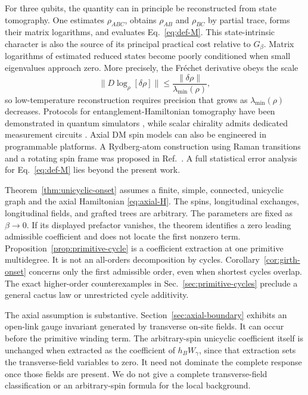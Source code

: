 \documentclass[aps,prb,preprint,nofootinbib,longbibliography]{revtex4-2}
\begin{document}
For three qubits, the quantity can in principle be reconstructed from state
tomography.  One estimates $\rho_{ABC}$, obtains $\rho_{AB}$ and $\rho_{BC}$
by partial trace, forms their matrix logarithms, and evaluates
Eq.~\eqref{eq:def-M}.  This state-intrinsic character
is also the source of its principal practical cost relative to $G_\beta$.
Matrix logarithms of estimated reduced states become poorly conditioned when small eigenvalues
approach zero.  More precisely, the Fr\'echet derivative obeys the scale
\begin{equation}
 \|D\log_\rho[\delta\rho]\|
 \le \frac{\|\delta\rho\|}{\lambda_{\min}(\rho)},
 \label{eq:log-conditioning}
\end{equation}
so low-temperature reconstruction requires precision that grows as
$\lambda_{\min}(\rho)$ decreases.  Protocols for entanglement-Hamiltonian
tomography have been demonstrated in quantum
simulators \cite{KokailEtAl2021}, while scalar chirality admits dedicated
measurement circuits \cite{ReascosEtAl2023}.  Axial DM spin models can also
be engineered in programmable platforms.  A Rydberg-atom construction using
Raman transitions and a rotating spin frame was proposed in
Ref.~\cite{KunimiEtAl2024}.  A full statistical error analysis for
Eq.~\eqref{eq:def-M} lies beyond the present work.

Theorem~\ref{thm:unicyclic-onset} assumes a finite, simple, connected,
unicyclic graph and the axial Hamiltonian \eqref{eq:axial-H}.  The spins,
longitudinal exchanges, longitudinal fields, and grafted trees are arbitrary.
The parameters are fixed as $\beta\to0$.  If its displayed prefactor
vanishes, the theorem identifies a zero leading admissible coefficient and
does not locate the first nonzero term.  Proposition~\ref{prop:primitive-cycle}
is a coefficient extraction at one primitive multidegree.  It is not an
all-orders decomposition by cycles.  Corollary~\ref{cor:girth-onset} concerns
only the first admissible order, even when shortest cycles overlap.  The exact
higher-order counterexamples in Sec.~\ref{sec:primitive-cycles} preclude a
general cactus law or unrestricted cycle additivity.

The axial assumption is substantive.  Section~\ref{sec:axial-boundary}
exhibits an open-link gauge invariant generated by transverse on-site fields.
It can occur before the primitive winding term.  The arbitrary-spin
unicyclic coefficient itself is unchanged when extracted as the coefficient
of $h_BW_\gamma$, since that extraction sets the transverse-field variables to
zero.  It need not dominate the complete response once those fields are
present.  We do not give a complete transverse-field classification or an
arbitrary-spin formula for the local background.
\end{document}
